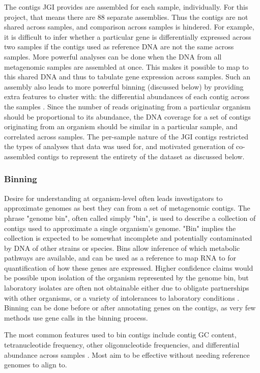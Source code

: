 The contigs JGI provides are assembled for each sample, individually.
For this project, that means there are 88 separate assemblies.
Thus the contigs are not shared across samples, and comparison across samples is hindered.
For example, it is difficult to infer whether a particular gene is differentially expressed across two samples if the contigs used as reference DNA are not the same across samples.
More powerful analyses can be done when the DNA from all metagenomic samples are assembled at once.
This makes it possible to map to this shared DNA and thus to tabulate gene expression across samples.
Such an assembly also leads to more powerful binning (discussed below) by providing extra features to cluster with: the differential abundances of each contig across the samples \cite{albertsen2013}.
Since the number of reads originating from a particular organism should be proportional to its abundance, the DNA coverage for a set of contigs originating from an organism should be similar in a particular sample, and correlated across samples.
The per-sample nature of the JGI contigs restricted the types of analyses that data was used for, and motivated generation of co-assembled contigs to represent the entirety of the dataset as discussed below.

\subsubsection{Binning}
Desire for understanding at organism-level often leads investigators to approximate genomes as best they can from a set of metagenomic contigs.
The phrase "genome bin", often called simply "bin", is used to describe a collection of contigs used to approximate a single organism's genome.
"Bin" implies the collection is expected to be somewhat incomplete and potentially contaminated by DNA of other strains or species.
Bins allow inference of which metabolic pathways are available, and can be used as a reference to map RNA to for quantification of how these genes are expressed.
Higher confidence claims would be possible upon isolation of the organism represented by the genome bin, but laboratory isolates are often not obtainable either due to obligate partnerships with other organisms, or a variety of intolerances to laboratory conditions \cite{stewart2012}.
Binning can be done before or after annotating genes on the contigs, as very few methods use gene calls in the binning process.

The most common features used to bin contigs include contig GC content, tetranucleotide frequency, other oligonucleotide frequencies, and differential abundance across samples \cite{sangwan2016}.
Most aim to be effective without needing reference genomes to align to.

